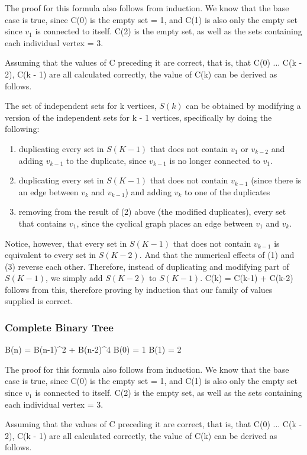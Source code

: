 \documentclass[11pt]{article}
\begin{document}
The proof for this formula also follows from induction. We know that the base case is true, since C(0) is the empty set = 1, and C(1) is also only the empty set since $v_1$ is connected to itself. C(2) is the empty set, as well as the sets containing each individual vertex = 3.

Assuming that the values of C preceding it are correct, that is, that C(0) ... C(k - 2), C(k - 1) are all calculated correctly, the value of C(k) can be derived as follows. 

The set of independent sets for k vertices, $S(k)$ can be obtained by modifying a version of the independent sets for k - 1 vertices, specifically by doing the following:\begin{enumerate}
	\item duplicating every set in $S(K - 1)$ that does not contain $v_1$ or $v_{k-2}$ and adding $v_{k-1}$ to the duplicate, since $v_{k-1}$ is no longer connected to $v_1$.
	\item duplicating every set in $S(K - 1)$ that does not contain $v_{k-1}$ (since there is an edge between $v_k$ and $v_{k-1}$) and adding $v_k$ to one of the duplicates
	\item removing from the result of (2) above (the modified duplicates), every set that contains $v_1$, since the cyclical graph places an edge between $v_1$ and $v_k$.
\end{enumerate}
Notice, however, that every set in $S(K-1)$ that does not contain $v_{k-1}$ is equivalent to every set in $S(K - 2)$. And that the numerical effects of (1) and (3) reverse each other. Therefore, instead of duplicating and modifying part of $S(K - 1)$, we simply add $S(K - 2)$ to $S(K - 1)$. C(k) = C(k-1) + C(k-2) follows from this, therefore proving by induction that our family of values supplied is correct.

\subsubsection{Complete Binary Tree}


	B(n) = B(n-1)^2 + B(n-2)^4
	B(0) = 1 
	B(1) = 2

The proof for this formula also follows from induction. We know that the base case is true, since C(0) is the empty set = 1, and C(1) is also only the empty set since $v_1$ is connected to itself. C(2) is the empty set, as well as the sets containing each individual vertex = 3.

Assuming that the values of C preceding it are correct, that is, that C(0) ... C(k - 2), C(k - 1) are all calculated correctly, the value of C(k) can be derived as follows. 
\end{document}
